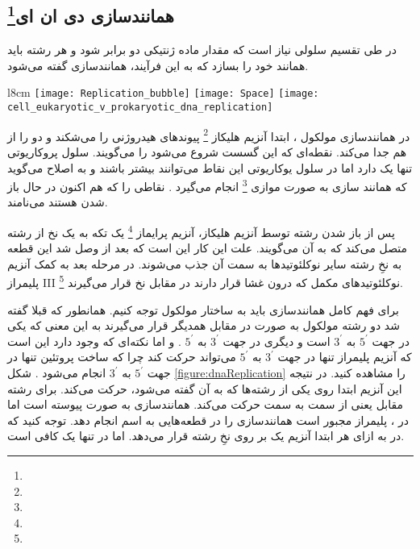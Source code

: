 \pagebreak
\subsection{همانندسازی دی ان ای\protect\footnote{}}

در طی تقسیم سلولی نیاز است که مقدار ماده ژنتیکی دو برابر شود و هر رشته
باید همانند خود را بسازد که به این فرآیند، همانندسازی
گفته می‌شود.

 \begin{wrapfigure}{l}{8cm}
	\centering
	\texttt{[image: Replication\_bubble]}
	\texttt{[image: Space]}
	\texttt{[image: cell\_eukaryotic\_v\_prokaryotic\_dna\_replication]}
	\vspace{-20pt}
\end{wrapfigure}

در همانندسازی مولکول
، ابتدا آنزیم هلیکاز
 \footnote{}
 پیوند‌های هیدروژنی را می‌شکند و دو
 را از هم جدا می‌کند. نقطه‌ای که این گسست شروع می‌شود را 
 می‌گویند.
 سلول پروکاریوتی تنها یک
  دارد اما در سلول یوکاریوتی این نقاط می‌توانند بیشتر باشند و به اصلاح می‌گوید که همانند سازی به صورت موازی
 \footnote{} 
انجام می‌گیرد 
 .
  نقاطی را که هم اکنون در حال باز شدن هستند
  می‌نامند.
  
پس از باز شدن رشته توسط آنزیم هلیکاز، آنزیم پرایماز
\footnote{}
یک تکه
به یک نخ از رشته
متصل می‌کند که به آن
می‌گویند. علت این کار این است که بعد از وصل شد
این قطعه به نخِ رشته
سایر نوکلئوتید‌ها به سمت آن جذب می‌شوند.
  در مرحله بعد به کمک آنزیم
 پلیمراز
 \RN{3}
 \footnote{}
 نوکلئوتید‌های مکمل که درون غشا قرار دارند در مقابل نخ
 قرار می‌گیرند.
 
 برای فهم کامل همانندسازی باید به ساختار مولکول
 توجه کنیم. همانطور که قبلا گفته شد دو رشته مولکول
 به صورت
 در مقابل همدیگر قرار می‌گیرند به این معنی که یکی در جهت
$ 5^\prime $
  به
$ 3^\prime $
  است و دیگری در جهت
$ 3^\prime $
  به
$ 5^\prime $
.
و اما نکته‌ای که وجود دارد این است که آنزیم
پلیمراز
تنها در جهت
$ 3^\prime $
  به
$ 5^\prime $
می‌تواند حرکت کند چرا که ساخت پروتئین تنها در جهت
$ 5^\prime $
  به
$ 3^\prime $
انجام می‌شود
.
شکل
\ref{figure:dnaReplication}
را مشاهده کنید.
در نتیجه این آنزیم ابتدا روی یکی از رشته‌ها که به آن
گفته می‌شود، حرکت می‌کند. برای رشته مقابل یعنی
از سمت
به سمت
حرکت می‌کند.
همانندسازی
به صورت پیوسته است اما در
،
پلیمراز
مجبور است همانندسازی را در قطعه‌هایی به اسم
انجام دهد. توجه کنید که در
به ازای هر
ابتدا آنزیم
یک
بر روی نخِ رشته قرار می‌دهد.  اما در
تنها یک
کافی است.


